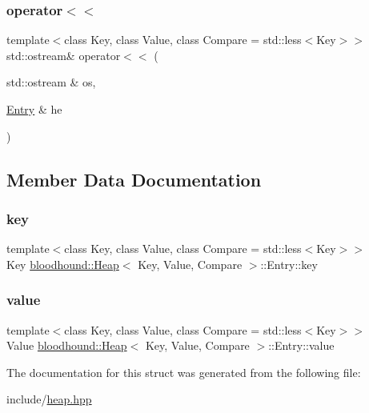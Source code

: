 \subsubsection{\texorpdfstring{operator$<$$<$}{operator<<}}
{\footnotesize\ttfamily template$<$class Key, class Value, class Compare = std\+::less$<$\+Key$>$$>$ \\
std\+::ostream\& operator$<$$<$ (\begin{DoxyParamCaption}\item[{std\+::ostream \&}]{os,  }\item[{\hyperlink{structbloodhound_1_1Heap_1_1Entry}{Entry} \&}]{he }\end{DoxyParamCaption})\hspace{0.3cm}{\ttfamily [friend]}}



\subsection{Member Data Documentation}
\mbox{\label{structbloodhound_1_1Heap_1_1Entry_abc30d59b3c7bd01c36df918c8a2dd597}} 
\subsubsection{\texorpdfstring{key}{key}}
{\footnotesize\ttfamily template$<$class Key, class Value, class Compare = std\+::less$<$\+Key$>$$>$ \\
Key \hyperlink{classbloodhound_1_1Heap}{bloodhound\+::\+Heap}$<$ Key, Value, Compare $>$\+::Entry\+::key}

\mbox{\label{structbloodhound_1_1Heap_1_1Entry_a4f777f54235490b4eb2f0f3af22b9c8b}} 
\subsubsection{\texorpdfstring{value}{value}}
{\footnotesize\ttfamily template$<$class Key, class Value, class Compare = std\+::less$<$\+Key$>$$>$ \\
Value \hyperlink{classbloodhound_1_1Heap}{bloodhound\+::\+Heap}$<$ Key, Value, Compare $>$\+::Entry\+::value}



The documentation for this struct was generated from the following file\+:\begin{DoxyCompactItemize}
\item 
include/\hyperlink{heap_8hpp}{heap.\+hpp}\end{DoxyCompactItemize}

